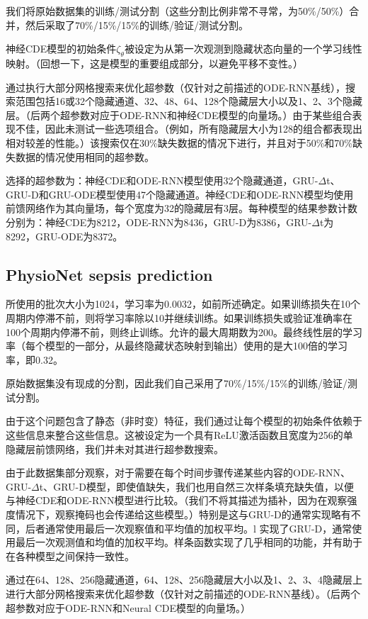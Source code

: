 \documentclass{ctexart}
\theoremstyle{plain}
\theoremstyle{definition}
\begin{document}
	我们将原始数据集的训练/测试分割（这些分割比例非常不寻常，为50\%/50\%）合并，然后采取了70\%/15\%/15\%的训练/验证/测试分割。
	
	神经CDE模型的初始条件$\zeta_\theta$被设定为从第一次观测到隐藏状态向量的一个学习线性映射。（回想一下，这是模型的重要组成部分，以避免平移不变性。）
	
	通过执行大部分网格搜索来优化超参数（仅针对之前描述的ODE-RNN基线），搜索范围包括16或32个隐藏通道、32、48、64、128个隐藏层大小以及1、2、3个隐藏层。（后两个超参数对应于ODE-RNN和神经CDE模型的向量场。）由于某些组合表现不佳，因此未测试一些选项组合。（例如，所有隐藏层大小为128的组合都表现出相对较差的性能。）该搜索仅在30\%缺失数据的情况下进行，并且对于50\%和70\%缺失数据的情况使用相同的超参数。
	
	选择的超参数为：神经CDE和ODE-RNN模型使用32个隐藏通道，GRU-$\Delta$t、GRU-D和GRU-ODE模型使用47个隐藏通道。神经CDE和ODE-RNN模型均使用前馈网络作为其向量场，每个宽度为32的隐藏层有3层。每种模型的结果参数计数分别为：神经CDE为8212，ODE-RNN为8436，GRU-D为8386，GRU-$\Delta$t为8292，GRU-ODE为8372。
	
	\subsection{PhysioNet sepsis prediction}\label{appendix:sepsis}
	所使用的批次大小为1024，学习率为0.0032，如前所述确定。如果训练损失在10个周期内停滞不前，则将学习率除以10并继续训练。如果训练损失或验证准确率在100个周期内停滞不前，则终止训练。允许的最大周期数为200。最终线性层的学习率（每个模型的一部分，从最终隐藏状态映射到输出）使用的是大100倍的学习率，即0.32。
	
	原始数据集没有现成的分割，因此我们自己采用了70\%/15\%/15\%的训练/验证/测试分割。
	
	由于这个问题包含了静态（非时变）特征，我们通过让每个模型的初始条件依赖于这些信息来整合这些信息。这被设定为一个具有ReLU激活函数且宽度为256的单隐藏层前馈网络，我们并未对其进行超参数搜索。
	
	由于此数据集部分观察，对于需要在每个时间步骤传递某些内容的ODE-RNN、GRU-$\Delta$t、GRU-D模型，即使值缺失，我们也用自然三次样条填充缺失值，以便与神经CDE和ODE-RNN模型进行比较。（我们不将其描述为插补，因为在观察强度情况下，观察掩码也会传递给这些模型。）特别是这与GRU-D的通常实现略有不同，后者通常使用最后一次观察值和平均值的加权平均。l 实现了GRU-D，通常使用最后一次观测值和均值的加权平均。样条函数实现了几乎相同的功能，并有助于在各种模型之间保持一致性。
	
	通过在64、128、256隐藏通道，64、128、256隐藏层大小以及1、2、3、4隐藏层上进行大部分网格搜索来优化超参数（仅针对之前描述的ODE-RNN基线）。（后两个超参数对应于ODE-RNN和Neural CDE模型的向量场。）
	
\end{document}
